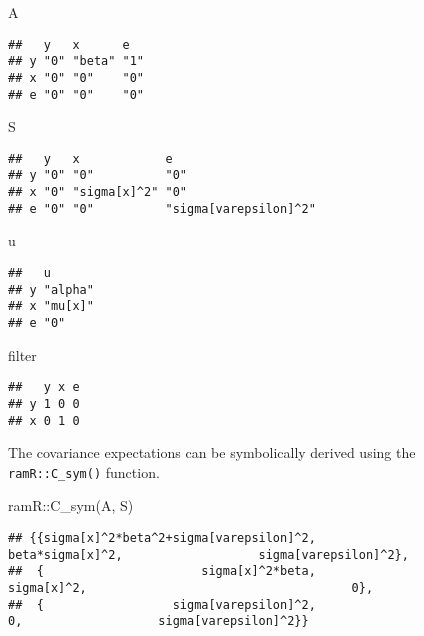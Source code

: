 \documentclass[
]{book}
\newenvironment{Shaded}{\begin{snugshade}}{\end{snugshade}}
\newcommand{\FunctionTok}[1]{\textcolor[rgb]{0.00,0.00,0.00}{#1}}
\newcommand{\NormalTok}[1]{#1}
\newcommand{\SpecialCharTok}[1]{\textcolor[rgb]{0.00,0.00,0.00}{#1}}
\theoremstyle{definition}
\theoremstyle{definition}
\theoremstyle{definition}
\theoremstyle{remark}
\begin{document}
\begin{Shaded}
\begin{Highlighting}[]
\NormalTok{A}
\end{Highlighting}
\end{Shaded}

\begin{verbatim}
##   y   x      e  
## y "0" "beta" "1"
## x "0" "0"    "0"
## e "0" "0"    "0"
\end{verbatim}

\begin{Shaded}
\begin{Highlighting}[]
\NormalTok{S}
\end{Highlighting}
\end{Shaded}

\begin{verbatim}
##   y   x            e                    
## y "0" "0"          "0"                  
## x "0" "sigma[x]^2" "0"                  
## e "0" "0"          "sigma[varepsilon]^2"
\end{verbatim}

\begin{Shaded}
\begin{Highlighting}[]
\NormalTok{u}
\end{Highlighting}
\end{Shaded}

\begin{verbatim}
##   u      
## y "alpha"
## x "mu[x]"
## e "0"
\end{verbatim}

\begin{Shaded}
\begin{Highlighting}[]
\NormalTok{filter}
\end{Highlighting}
\end{Shaded}

\begin{verbatim}
##   y x e
## y 1 0 0
## x 0 1 0
\end{verbatim}

The covariance expectations
can be symbolically derived using the \texttt{ramR::C\_sym()} function.

\begin{Shaded}
\begin{Highlighting}[]
\NormalTok{ramR}\SpecialCharTok{::}\FunctionTok{C\_sym}\NormalTok{(A, S)}
\end{Highlighting}
\end{Shaded}

\begin{verbatim}
## {{sigma[x]^2*beta^2+sigma[varepsilon]^2,                       beta*sigma[x]^2,                   sigma[varepsilon]^2},
##  {                      sigma[x]^2*beta,                            sigma[x]^2,                                     0},
##  {                  sigma[varepsilon]^2,                                     0,                   sigma[varepsilon]^2}}
\end{verbatim}
\end{document}
